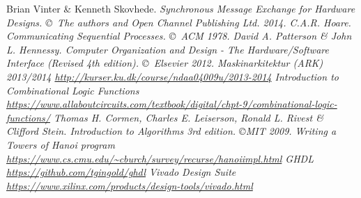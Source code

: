 \begin{thebibliography}{9}
     Brian Vinter \& Kenneth Skovhede. \it{Synchronous Message
        Exchange for Hardware Designs}. \copyright\ The authors and Open
        Channel Publishing Ltd. 2014.
     C.A.R. Hoare. \it{Communicating Sequential Processes}.
        \copyright\ ACM 1978.
     David A. Patterson \& John L. Hennessy. \it{Computer
        Organization and Design - The Hardware/Software Interface (Revised 4th
        edition)}.  \copyright\ Elsevier 2012.
     \it{Maskinarkitektur (ARK) 2013/2014}
        \url{http://kurser.ku.dk/course/ndaa04009u/2013-2014}
     Introduction to Combinational Logic Functions
        \url{https://www.allaboutcircuits.com/textbook/digital/chpt-9/combinational-logic-functions/}
     Thomas H. Cormen, Charles E. Leiserson, Ronald L. Rivest
        \& Clifford Stein. \it{Introduction to Algorithms 3rd edition}.
        \copyright MIT 2009.
     Writing a Towers of Hanoi program
        \url{https://www.cs.cmu.edu/~cburch/survey/recurse/hanoiimpl.html}
     GHDL
        \url{https://github.com/tgingold/ghdl}
     Vivado Design Suite
        \url{https://www.xilinx.com/products/design-tools/vivado.html}
\end{thebibliography}

